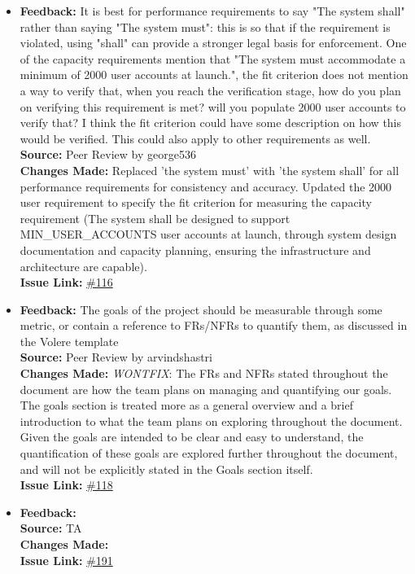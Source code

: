 \documentclass{article}
\begin{document}
\begin{itemize}
  \item 
    \textbf{Feedback:} It is best for performance requirements to say "The system shall" rather than saying "The system must": this is so that if the requirement is violated, using "shall" can provide a stronger legal basis for enforcement.
    One of the capacity requirements mention that "The system must accommodate a minimum of 2000 user accounts
    at launch.", the fit criterion does not mention a way to verify that, when you reach the verification stage, how do you plan on verifying this requirement is met? will you populate 2000 user accounts to verify that? I think the fit criterion could have some description on how this would be verified. This could also apply to other requirements as well.\\
    \textbf{Source:} Peer Review by george536\\
    \textbf{Changes Made:} Replaced 'the system must' with 'the system shall' for all performance requirements for consistency and accuracy. Updated the 2000 user requirement to specify the fit criterion for measuring the capacity requirement (The system shall be designed to support MIN\_USER\_ACCOUNTS user accounts at launch, through system design documentation and capacity planning, ensuring the infrastructure and architecture are capable). \\
    \textbf{Issue Link:} \href{https://github.com/parishanizam/TeleHealth/issues/116}{\#116}
  
  \item 
    \textbf{Feedback:} The goals of the project should be measurable through some metric, or contain a reference to FRs/NFRs to quantify them, as discussed in the Volere template \\
    \textbf{Source:} Peer Review by arvindshastri\\
    \textbf{Changes Made:} \textit{WONTFIX}: The FRs and NFRs stated throughout the document are how the team plans on managing and quantifying our goals. The goals section is treated more as a general overview and a brief introduction to what the team plans on exploring throughout the document. Given the goals are intended to be clear and easy to understand, the quantification of these goals are explored further throughout the document, and will not be explicitly stated in the Goals section itself.\\
    \textbf{Issue Link:} \href{https://github.com/parishanizam/TeleHealth/issues/118}{\#118}

  \item 
    \textbf{Feedback:}  \\
    \textbf{Source:} TA \\
    \textbf{Changes Made:} \\
    \textbf{Issue Link:} \href{https://github.com/parishanizam/TeleHealth/issues/191}{\#191}


\end{itemize}
\end{document}

